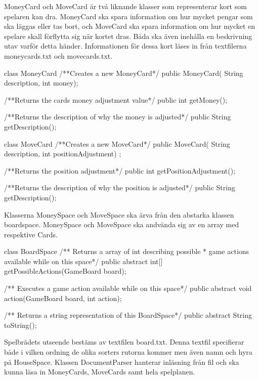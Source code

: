 MoneyCard och MoveCard är två liknande klasser som representerar kort som spelaren kan dra. MoneyCard ska spara information om hur mycket pengar som ska läggas eller tas bort, och MoveCard ska spara information om hur mycket en spelare skall förflytta sig när kortet dras. Båda ska även inehålla en beskrivning utav varför detta händer. Informationen för dessa kort läses in från textfilerna moneycards.txt och movecards.txt.

\begin{JavaSpec}{class MoneyCard}
    /**Creates a new MoneyCard*/
    public MoneyCard( String description, int money);

    /**Returns the cards money adjustment value*/
    public int getMoney();

    /**Returns the description of why the money is adjusted*/ 
    public String getDescription();
\end{JavaSpec}

\begin{JavaSpec}{class MoveCard}
    /**Creates a new MoveCard*/
    public MoveCard( String description, int positionAdjustment) ;

    /**Returns the position adjustment*/
    public int getPositionAdjustment();

    /**Returns the description of why the position is adjusted*/
    public String getDescription();

\end{JavaSpec}

Klasserna MoneySpace och MoveSpace ska ärva från den abstarka klassen boardspace. MoneySpace och MoveSpace ska andvända sig av en array med respektive Cards.

\begin{JavaSpec}{class BoardSpace}
    /** Returns a array of int describing possible
      * game actions available while on this space*/
    public abstract int[] getPossibleActions(GameBoard board);

    /** Executes a game action available while on this space*/
    public abstract void action(GameBoard board, int action);

    /** Returns a string representation of this BoardSpace*/
    public abstract String toString();
\end{JavaSpec}

Spelbrädets utseende bestäms av textfilen board.txt. Denna textfil specifierar både i vilken ordning de olika sorters rutorna kommer men även namn och hyra på HouseSpace. Klassen DocumentParser hanterar inläsning från fil och ska kunna läsa in MoneyCards, MoveCards samt hela spelplanen. 

